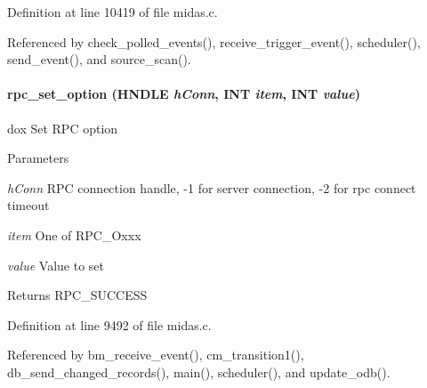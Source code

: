 Definition at line 10419 of file midas.c.

Referenced by check\_\-polled\_\-events(), receive\_\-trigger\_\-event(), scheduler(), send\_\-event(), and source\_\-scan().
\paragraph[{rpc\_\-set\_\-option}]{ rpc\_\-set\_\-option (HNDLE {\em hConn}, \/  {\bf INT} {\em item}, \/  {\bf INT} {\em value})}\hfill\label{group__rpcfunctionc_gaab360e4fd185439b0913c723581115ea}
dox Set RPC option 
\begin{DoxyParams}{Parameters}
\item[{\em hConn}]RPC connection handle, -\/1 for server connection, -\/2 for rpc connect timeout \item[{\em item}]One of RPC\_\-Oxxx \item[{\em value}]Value to set \end{DoxyParams}
\begin{DoxyReturn}{Returns}
RPC\_\-SUCCESS 
\end{DoxyReturn}


Definition at line 9492 of file midas.c.

Referenced by bm\_\-receive\_\-event(), cm\_\-transition1(), db\_\-send\_\-changed\_\-records(), main(), scheduler(), and update\_\-odb().